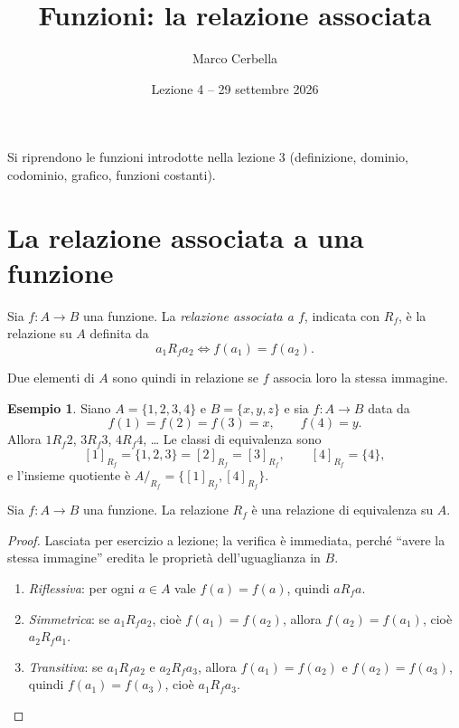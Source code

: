\documentclass[11pt,a4paper]{article}
\title{Funzioni: la relazione associata}
\author{Marco Cerbella}
\date{Lezione 4 -- 29 settembre 2026}
\theoremstyle{definition}
\newtheorem*{esempio}{Esempio}
\begin{document}
\maketitle

Si riprendono le funzioni introdotte nella lezione 3 (definizione, dominio, codominio, grafico, funzioni costanti).

\section{La relazione associata a una funzione}

\begin{definizione}
Sia $f : A \to B$ una funzione. La \emph{relazione associata a $f$}, indicata
con $R_f$, è la relazione su $A$ definita da
\[
a_1 \mathrel{R_f} a_2 \iff f(a_1) = f(a_2).
\]
\end{definizione}

Due elementi di $A$ sono quindi in relazione se $f$ associa loro la stessa
immagine.

\begin{esempio}
Siano $A = \{1, 2, 3, 4\}$ e $B = \{x, y, z\}$ e sia $f : A \to B$ data da
\[
f(1) = f(2) = f(3) = x, \qquad f(4) = y.
\]
Allora $1 \mathrel{R_f} 2$, $3 \mathrel{R_f} 3$, $4 \mathrel{R_f} 4$, \dots{}
Le classi di equivalenza sono
\[
[1]_{R_f} = \{1, 2, 3\} = [2]_{R_f} = [3]_{R_f}, \qquad
[4]_{R_f} = \{4\},
\]
e l'insieme quotiente è $A/_{R_f} = \{[1]_{R_f}, [4]_{R_f}\}$.
\end{esempio}

\begin{teorema}
Sia $f : A \to B$ una funzione. La relazione $R_f$ è una relazione di
equivalenza su $A$.
\end{teorema}

\begin{proof}
Lasciata per esercizio a lezione; la verifica è
immediata, perché ``avere la stessa immagine'' eredita le proprietà
dell'uguaglianza in $B$.
\begin{enumerate}
    \item \emph{Riflessiva}: per ogni $a \in A$ vale $f(a) = f(a)$, quindi
          $a \mathrel{R_f} a$.
    \item \emph{Simmetrica}: se $a_1 \mathrel{R_f} a_2$, cioè
          $f(a_1) = f(a_2)$, allora $f(a_2) = f(a_1)$, cioè
          $a_2 \mathrel{R_f} a_1$.
    \item \emph{Transitiva}: se $a_1 \mathrel{R_f} a_2$ e
          $a_2 \mathrel{R_f} a_3$, allora $f(a_1) = f(a_2)$ e
          $f(a_2) = f(a_3)$, quindi $f(a_1) = f(a_3)$, cioè
          $a_1 \mathrel{R_f} a_3$. \qedhere
\end{enumerate}
\end{proof}
\end{document}
